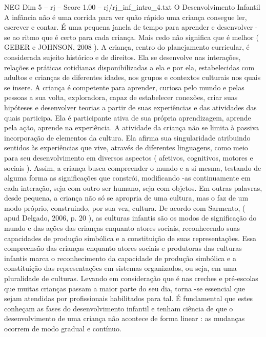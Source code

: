 \begin{textsample}{NEG Dim 5 – rj – Score 1.00 – rj/rj\_inf\_intro\_4.txt}  \label{ex:f5_neg_100}
O Desenvolvimento Infantil A infância não é uma corrida para ver quão rápido uma criança consegue ler, escrever e contar.
É uma pequena janela de tempo para aprender e desenvolver -se ao ritmo que é certo para cada criança.
Mais cedo não significa que é melhor ( GEBER e JOHNSON, 2008 ).
A criança, centro do planejamento curricular, é considerada sujeito histórico e de direitos.
Ela se desenvolve nas interações, relações e práticas cotidianas disponibilizadas a ela e por ela, estabelecidas com adultos e crianças de diferentes idades, nos grupos e contextos culturais nos quais se insere.
A criança é competente para aprender, curiosa pelo mundo e pelas pessoas a sua volta, exploradora, capaz de estabelecer conexões, criar suas hipóteses e desenvolver teorias a partir de suas experiências e das atividades das quais participa.
Ela é participante ativa de sua própria aprendizagem, aprende pela ação, aprende na experiência.
A atividade da criança não se limita à passiva incorporação de elementos da cultura.
Ela afirma sua singularidade atribuindo sentidos às experiências que vive, através de diferentes linguagens, como meio para seu desenvolvimento em diversos aspectos ( afetivos, cognitivos, motores e sociais ).
Assim, a criança busca compreender o mundo e a si mesma, testando de alguma forma as significações que constrói, modificando -as continuamente em cada interação, seja com outro ser humano, seja com objetos.
Em outras palavras, desde pequena, a criança não só se apropria de uma cultura, mas o faz de um modo próprio, construindo, por sua vez, cultura.
De acordo com Sarmento, ( apud Delgado, 2006, p. 20 ), as culturas infantis são os modos de significação do mundo e das ações das crianças enquanto atores sociais, reconhecendo suas capacidades de produção simbólica e a constituição de suas representações.
Essa compreensão das crianças enquanto atores sociais e produtoras das culturas infantis marca o reconhecimento da capacidade de produção simbólica e a constituição das representações em sistemas organizados, ou seja, em uma pluralidade de culturas.
Levando em consideração que é nas creches e pré-escolas que muitas crianças passam a maior parte do seu dia, torna -se essencial que sejam atendidas por profissionais habilitados para tal.
É fundamental que estes conheçam as fases do desenvolvimento infantil e tenham ciência de que o desenvolvimento de uma criança não acontece de forma linear : as mudanças ocorrem de modo gradual e contínuo.

\end{textsample}
